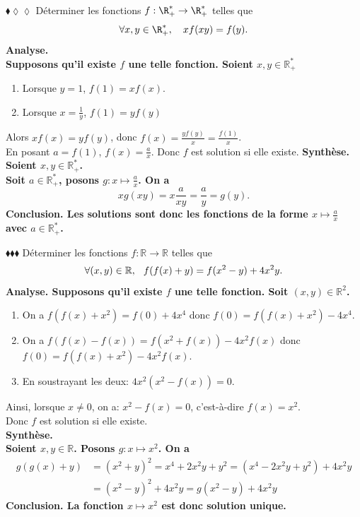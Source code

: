 \documentclass[11pt]{article}
\begin{document}
\begin{exercice}{$\blacklozenge\lozenge\lozenge$}{}
    Déterminer les fonctions $f:\R_+^* \rightarrow \R_+^*$ telles que 
    \begin{equation*}
        \forall x,y \in \R^*_+, \quad xf(xy) = f(y).
    \end{equation*}
    \tcblower
    \bf{Analyse.}\\
    Supposons qu'il existe $f$ une telle fonction. Soient $x,y\in\mathbb{R}^*_+$
    \begin{enumerate}
        \item Lorsque $y=1$, $f(1)=xf(x)$.
        \item Lorsque $x=\frac{1}{y}$, $f(1)=yf(y)$
    \end{enumerate}
    Alors $xf(x)=yf(y)$, donc $f(x)=\frac{yf(y)}{x}=\frac{f(1)}{x}$.\\
    En posant $a=f(1)$, $f(x)=\frac{a}{x}$.
    Donc $f$ est solution si elle existe.\n
    \bf{Synthèse.}\\
    Soient $x,y\in\mathbb{R}^*_+$.\\
    Soit $a\in\mathbb{R^*_+}$, posons $g:x\mapsto\frac{a}{x}$. On a
    \begin{equation*}
        xg(xy)=x\frac{a}{xy}=\frac{a}{y}=g(y).
    \end{equation*}
    \bf{Conclusion.} Les solutions sont donc les fonctions de la forme $x\mapsto\frac{a}{x}$ avec $a\in\mathbb{R^*_+}$.
\end{exercice}

\begin{exercice}{$\blacklozenge\blacklozenge\blacklozenge$}{}
    Déterminer les fonctions $f: \mathbb{R} \rightarrow \mathbb{R}$ telles que 
    \begin{equation*}
        \forall{(x,y)\in\mathbb{R}}, \hspace{0.25cm} f(f(x)+y) = f(x^2-y)+4x^2y.
    \end{equation*}
    \tcblower
    \bf{Analyse.}
    Supposons qu'il existe $f$ une telle fonction. Soit $(x,y)\in\mathbb{R}^2$. 
    \begin{enumerate}
        \item On a $f(f(x)+x^2)=f(0)+4x^4$ donc $f(0)=f(f(x)+x^2)-4x^4$.
        \item On a $f(f(x)-f(x))=f(x^2+f(x))-4x^2f(x)$ donc $f(0)=f(f(x)+x^2)-4x^2f(x)$. 
        \item En soustrayant les deux: $4x^2(x^2 - f(x)) = 0$.
    \end{enumerate}
    Ainsi, lorsque $x\neq0$, on a: $x^2-f(x) = 0$, c'est-à-dire $f(x)=x^2$.\\
    Donc $f$ est solution si elle existe.\\[0.2cm]
    \bf{Synthèse.}\\
    Soient $x,y\in\mathbb{R}$. Posons $g:x\mapsto x^2$. On a
    \begin{align*}
        g(g(x)+y)&=(x^2+y)^2 = x^4 + 2x^2y + y^2 = (x^4-2x^2y+y^2)+4x^2y\\
        &=(x^2-y)^2+4x^2y=g(x^2-y)+4x^2y
    \end{align*}
    \bf{Conclusion.} La fonction $x\mapsto x^2$ est donc solution unique.
\end{exercice}
\end{document}
